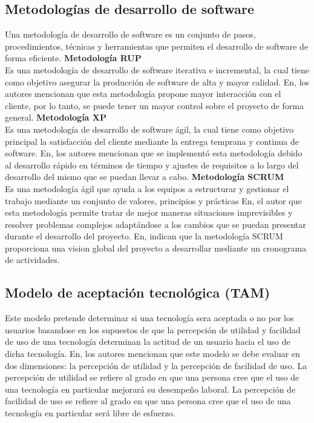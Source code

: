 \subsection{Metodologías de desarrollo de software}
Una metodología de desarrollo de software es un conjunto de pasos, procedimientos, técnicas y herramientas que permiten el desarrollo de software de forma eficiente.
\bigbreak
\textbf {Metodología RUP} \\
Es una metodología de desarrollo de software iterativa e incremental, la cual tiene como objetivo asegurar la producción de software de alta y mayor calidad. En\cite{moscayzaSistemaWebPara}, los autores mencionan que esta metodología propone mayor interacción con el cliente, por lo tanto, se puede tener un mayor control sobre el proyecto de forma general.
\bigbreak
\textbf{Metodología XP} \\
Es una metodología de desarrollo de software ágil, la cual tiene como objetivo principal la satisfacción del cliente mediante la entrega temprana y continua de software. En\cite{ortegaAnalisisDisenoImplementacion2017}, los autores mencionan que se implementó esta metodología debido al desarrollo rápido en términos de tiempo y ajustes de requisitos a lo largo del desarrollo del mismo que se puedan llevar a cabo.
\bigbreak
\textbf{Metodología SCRUM} \\
Es una metodología ágil que ayuda a los equipos a estructurar y gestionar el trabajo mediante un conjunto de valores, principios y prácticas
En\cite{moreiraDESARROLLOSISTEMAWEB2019}, el autor que esta metodología permite tratar de mejor maneras situaciones imprevisibles y resolver problemas complejos adaptándose a los cambios que se puedan presentar durante el desarrollo del proyecto. En\cite{castroReconocimientoFacialGeolocalizacion2023}, indican que la metodología SCRUM proporciona una vision global del proyecto a desarrollar mediante un cronograma de actividades.

\subsection{Modelo de aceptación tecnológica (TAM)}

Este modelo pretende determinar si una tecnología sera aceptada o no por los usuarios basandose en los supuestos de que la percepción de utilidad y facilidad de uso de una tecnología determinan la actitud de un usuario hacia el uso de dicha tecnología. En\cite{tam}, los autores mencionan que este modelo se debe evaluar en dos dimensiones: la percepción de utilidad y la percepción de facilidad de uso. La percepción de utilidad se refiere al grado en que una persona cree que el uso de una tecnología en particular mejorará su desempeño laboral. La percepción de facilidad de uso se refiere al grado en que una persona cree que el uso de una tecnología en particular será libre de esfuerzo.


